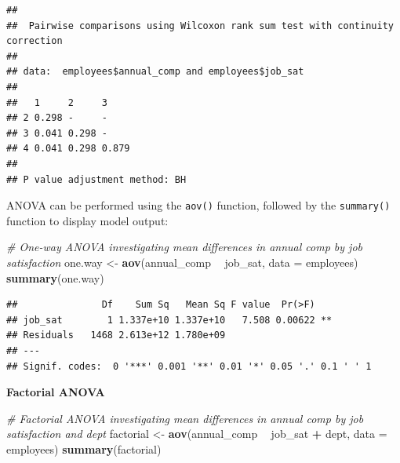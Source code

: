 \documentclass[]{book}
\newenvironment{Shaded}{\begin{snugshade}}{\end{snugshade}}
\newcommand{\CommentTok}[1]{\textcolor[rgb]{0.56,0.35,0.01}{\textit{#1}}}
\newcommand{\DataTypeTok}[1]{\textcolor[rgb]{0.13,0.29,0.53}{#1}}
\newcommand{\KeywordTok}[1]{\textcolor[rgb]{0.13,0.29,0.53}{\textbf{#1}}}
\newcommand{\NormalTok}[1]{#1}
\newcommand{\OperatorTok}[1]{\textcolor[rgb]{0.81,0.36,0.00}{\textbf{#1}}}
\newcommand{\StringTok}[1]{\textcolor[rgb]{0.31,0.60,0.02}{#1}}
\begin{document}
\begin{Shaded}
\end{Shaded}

\begin{verbatim}
## 
##  Pairwise comparisons using Wilcoxon rank sum test with continuity correction 
## 
## data:  employees$annual_comp and employees$job_sat 
## 
##   1     2     3    
## 2 0.298 -     -    
## 3 0.041 0.298 -    
## 4 0.041 0.298 0.879
## 
## P value adjustment method: BH
\end{verbatim}

ANOVA can be performed using the \texttt{aov()} function, followed by the \texttt{summary()} function to display model output:

\begin{Shaded}
\begin{Highlighting}[]
\CommentTok{# One-way ANOVA investigating mean differences in annual comp by job satisfaction}
\NormalTok{one.way <-}\StringTok{ }\KeywordTok{aov}\NormalTok{(annual_comp }\OperatorTok{~}\StringTok{ }\NormalTok{job_sat, }\DataTypeTok{data =}\NormalTok{ employees)}
\KeywordTok{summary}\NormalTok{(one.way)}
\end{Highlighting}
\end{Shaded}

\begin{verbatim}
##               Df    Sum Sq   Mean Sq F value  Pr(>F)   
## job_sat        1 1.337e+10 1.337e+10   7.508 0.00622 **
## Residuals   1468 2.613e+12 1.780e+09                   
## ---
## Signif. codes:  0 '***' 0.001 '**' 0.01 '*' 0.05 '.' 0.1 ' ' 1
\end{verbatim}

\textbf{Factorial ANOVA}

\begin{Shaded}
\begin{Highlighting}[]
\CommentTok{# Factorial ANOVA investigating mean differences in annual comp by job satisfaction and dept}
\NormalTok{factorial <-}\StringTok{ }\KeywordTok{aov}\NormalTok{(annual_comp }\OperatorTok{~}\StringTok{ }\NormalTok{job_sat }\OperatorTok{+}\StringTok{ }\NormalTok{dept, }\DataTypeTok{data =}\NormalTok{ employees)}
\KeywordTok{summary}\NormalTok{(factorial)}
\end{Highlighting}
\end{Shaded}
\end{document}
